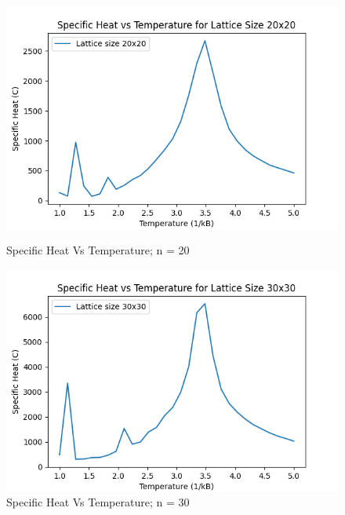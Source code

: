 \documentclass[11pt]{article}
\begin{document}
\begin{figure}[H]
    \centering
    \begin{minipage}{0.48\textwidth}
        \centering
        \includegraphics[width=\textwidth]{Specific_Heat_vs_Temperature_n20.png}
        \caption{Specific Heat Vs Temperature; n = 20}
        \label{fig:23}
    \end{minipage}\hfill %
    \begin{minipage}{0.48\textwidth}
        \centering
        \includegraphics[width=\textwidth]{Specific_Heat_vs_Temperature_n30.png}
        \caption{Specific Heat Vs Temperature; n = 30}
        \label{fig:24}
    \end{minipage}
\end{figure}
\end{document}
